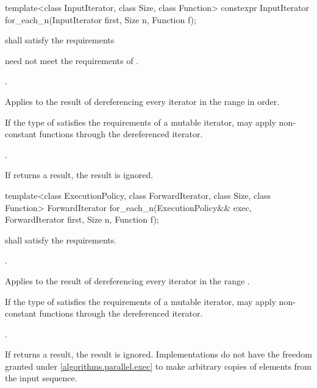 %
\begin{itemdecl}
template<class InputIterator, class Size, class Function>
  constexpr InputIterator for_each_n(InputIterator first, Size n, Function f);
\end{itemdecl}

\begin{itemdescr}
\pnum
\requires
{} shall satisfy the  requirements
\begin{note}  need not meet the requirements of
. \end{note}

\pnum
\requires
{}.

\pnum
\effects
Applies  to the result of dereferencing every iterator in the range
 in order.
\begin{note}
If the type of  satisfies the requirements of a mutable iterator,
 may apply non-constant functions through the dereferenced iterator.
\end{note}

\pnum
\returns
{}.

\pnum
\remarks
If  returns a result, the result is ignored.
\end{itemdescr}

%
\begin{itemdecl}
template<class ExecutionPolicy, class ForwardIterator, class Size, class Function>
  ForwardIterator for_each_n(ExecutionPolicy&& exec, ForwardIterator first, Size n,
                             Function f);
\end{itemdecl}

\begin{itemdescr}
\pnum
\requires
{} shall satisfy the  requirements.

\pnum
\requires
{}.

\pnum
\effects
Applies  to the result of dereferencing every iterator in the range
.
\begin{note}
If the type of  satisfies the requirements of a mutable iterator,
 may apply non-constant functions through the dereferenced iterator.
\end{note}

\pnum
\returns
{}.

\pnum
\remarks
If  returns a result, the result is ignored.  Implementations do not
have the freedom granted under \ref{algorithms.parallel.exec} to make arbitrary
copies of elements from the input sequence.
\end{itemdescr}


